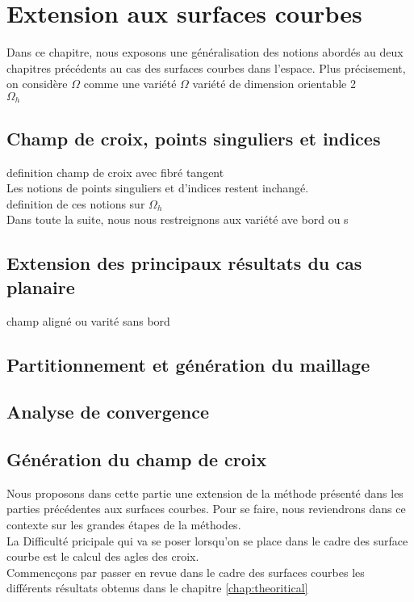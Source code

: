 \chapter{Extension aux surfaces courbes}
\label{chap:surface_courbe}
\minitoc

Dans ce chapitre, nous exposons une généralisation des notions abordés au deux chapitres précédents au cas des surfaces courbes dans l'espace. Plus précisement, on considère $\Omega$ comme une variété $\Omega$ variété de dimension orientable 2\\
$\Omega_h$

\section{Champ de croix, points singuliers et indices}
definition champ de croix avec fibré tangent\\
Les notions de points singuliers et d'indices restent inchangé.\\
definition de ces notions sur $\Omega_h$\\
Dans toute la suite, nous nous restreignons aux variété ave bord ou s
\section{Extension des principaux résultats du cas planaire}
champ aligné ou varité sans bord\\

\section{Partitionnement et génération du maillage}

\section{Analyse de convergence}

\section{Génération du champ de croix}

Nous proposons dans cette partie une extension de la méthode présenté dans les parties précédentes aux surfaces courbes. Pour se faire, nous reviendrons dans ce contexte sur les grandes étapes de la méthodes.
\[\]
La Difficulté pricipale qui va se poser lorsqu'on se place dans le cadre des surface courbe est le calcul des agles des croix.
\[\]
Commencçons par passer en revue dans le cadre des surfaces courbes les différents résultats obtenus dans le chapitre \ref{chap:theoritical}
\[\]

